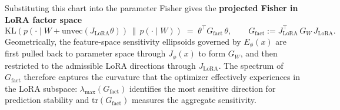 \documentclass{article} %
\begin{document}
Substituting this chart into the parameter Fisher gives the \textbf{projected Fisher in LoRA factor space}
\begin{equation}
\label{eq:lora-fisher}
\mathrm{KL}\!\left(p(\cdot\mid W+\mathrm{unvec}(J_{\mathrm{LoRA}}\theta))\,\big\|\,p(\cdot\mid W)\right)
\;=\; \theta^\top G_{\mathrm{fact}}\,\theta,
\qquad
G_{\mathrm{fact}}:=J_{\mathrm{LoRA}}^\top\,G_W\,J_{\mathrm{LoRA}}.
\end{equation}
Geometrically, the feature-space sensitivity ellipsoids governed by $E_\phi(x)$ are first pulled back to parameter space through $J_\phi(x)$ to form $G_W$, and then restricted to the admissible LoRA directions through $J_{\mathrm{LoRA}}$. The spectrum of $G_{\mathrm{fact}}$ therefore captures the curvature that the optimizer effectively experiences in the LoRA subspace: $\lambda_{\max}(G_{\mathrm{fact}})$ identifies the most sensitive direction for prediction stability and $\mathrm{tr}(G_{\mathrm{fact}})$ measures the aggregate sensitivity.
\end{document}
